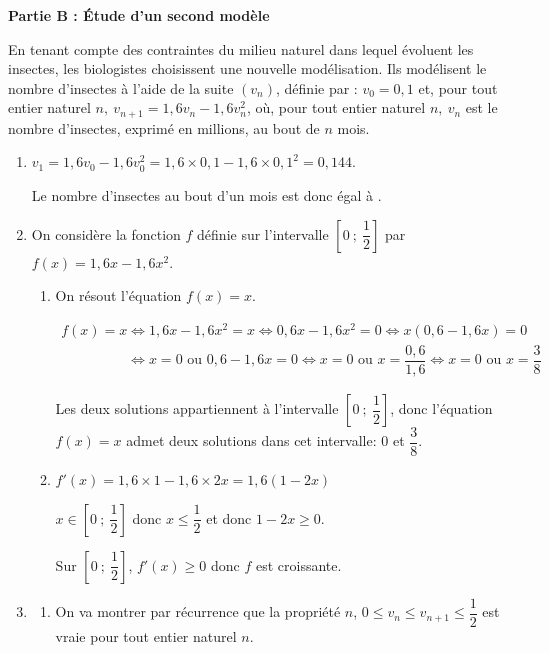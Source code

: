 \bigskip

\textbf{Partie B : Étude d'un second modèle}

\medskip

En tenant compte des contraintes du milieu naturel dans lequel évoluent les insectes, les biologistes choisissent une nouvelle modélisation.
Ils modélisent le nombre d'insectes à l'aide de la suite $\left(v_n\right)$, définie par :
$v_0 = 0,1$  et, pour tout entier naturel $n,\: v_{n+1} = 1,6v_n - 1,6v_n^2$,
où, pour tout entier naturel $n,\: v_n$ est le nombre d'insectes, exprimé en millions, au bout de $n$ mois.

\medskip

\begin{enumerate}
\item $v_1=1,6v_0 - 1,6 v_0^2 = 1,6\times 0,1 - 1,6\times 0,1^2 = 0,144$.

Le nombre d'insectes au bout d'un mois est donc égal à .

\item On considère la fonction $f$ définie sur l'intervalle $\left[0~;~\dfrac12\right]$ par
$f(x) = 1,6x - 1,6x^2$.

	\begin{enumerate}
		\item On résout l'équation $f(x) = x$.

$\begin{gathered}f(x)=x
\iff
1,6x-1,6x^2=x
\iff
0,6x - 1,6x^2=0
\iff
x\left (0,6-1,6x\right )=0\\
\phantom{f(x)=x}
\iff
x=0 \text{ ou }	0,6-1,6x=0
\iff
x=0 \text{ ou } x=\dfrac{0,6}{1,6}
\iff
x=0 \text{ ou } x=\dfrac{3}{8}\end{gathered}$

Les deux solutions appartiennent à l'intervalle $\left[0~;~\dfrac12\right]$, donc l'équation $f(x)=x$ admet deux solutions dans cet intervalle: 0 et $\dfrac{3}{8}$.
		
		\item 
$f'(x)=1,6\times 1 - 1,6\times 2x = 1,6\left (1-2x\right )$

$x\in\left[0~;~\dfrac12\right]$ donc $x\leqslant \dfrac{1}{2}$ et donc $1-2x\geqslant 0$.

Sur $\left[0~;~\dfrac12\right]$, $f'(x)\geqslant 0$ donc $f$ est croissante.
			\end{enumerate}
\item 
	\begin{enumerate}
		\item On va montrer par récurrence que la propriété $n$, $0 \leqslant v_n  \leqslant  v_{n+1} \leqslant  \dfrac12$ est vraie pour tout entier naturel $n$.
		

\end{enumerate}
\end{enumerate}
